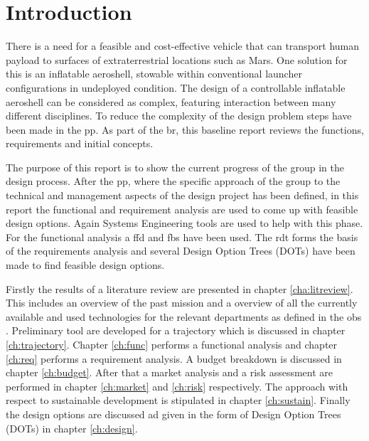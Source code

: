 \section{Introduction}\label{cha:introduction}
There is a need for a feasible and cost-effective vehicle that can transport human payload to surfaces of extraterrestrial locations such as Mars. One solution for this is an inflatable aeroshell, stowable within conventional launcher configurations in undeployed condition. The design of a controllable inflatable aeroshell can be considered as complex, featuring interaction between many different disciplines. To reduce the complexity of the design problem steps have been made in the \gls{pp}. As part of the \gls{br}, this baseline report reviews the functions, requirements and initial concepts.

The purpose of this report is to show the current progress of the group in the design process. After the \gls{pp}, where the specific approach of the group to the technical and management aspects of the design project has been defined, in this report the functional and requirement analysis are used to come up with feasible design options. Again Systems Engineering tools are used to help with this phase. For the functional analysis a \acrfull{ffd} and \acrfull{fbs} have been used. The \acrfull{rdt} forms the basis of the requirements analysis and several Design Option Trees (DOTs) have been made to find feasible design options.

Firstly the results of a literature review are presented in chapter \ref{cha:litreview}. This includes an overview of the past mission and a overview of all the currently available and used technologies for the relevant departments as defined in the \gls{obs} \cite{Balasooriyan2015}. Preliminary tool are developed for a trajectory which is discussed in chapter \ref{ch:trajectory}. Chapter \ref{ch:func} performs a functional analysis and chapter \ref{ch:req} performs a requirement analysis. A budget breakdown is discussed in chapter \ref{ch:budget}. After that a market analysis and a risk assessment are performed in chapter \ref{ch:market} and \ref{ch:risk} respectively. The approach with respect to sustainable development is stipulated in chapter \ref{ch:sustain}. Finally the design options are discussed ad given in the form of Design Option Trees (DOTs) in chapter \ref{ch:design}. 



